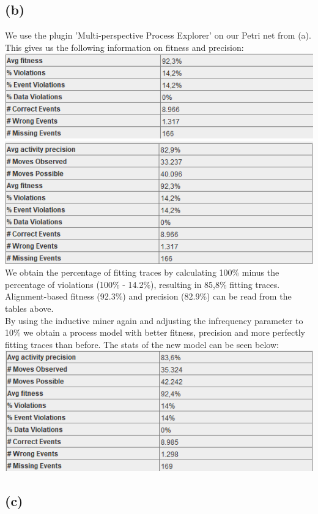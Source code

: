 \documentclass[../../main.tex]{subfiles}
\begin{document}
\subsection*{(b)}
We use the plugin 'Multi-perspective Process Explorer' on our Petri net from (a). This gives us the following information on fitness and precision:\\
\includegraphics[width=0.5\columnwidth]{img/ProM_b_fitness.png}
\includegraphics[width=0.5\columnwidth]{img/ProM_b_precision.png}\\
We obtain the percentage of fitting traces by calculating 100\% minus the percentage of violations (100\% - 14.2\%), resulting in 85,8\% fitting traces. Alignment-based fitness (92.3\%) and precision (82.9\%) can be read from the tables above.\\
By using the inductive miner again and adjusting the infrequency parameter to 10\% we obtain a process model with better fitness, precision and more perfectly fitting traces than before. The stats of the new model can be seen below:\\
\includegraphics[width=0.5\columnwidth]{img/ProM_b_model_2.png}

\subsection*{(c)}
\end{document}

